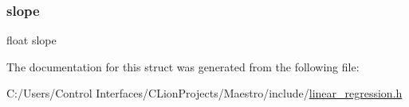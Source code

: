 \mbox{\label{struct_interpolation_model_a837fbee09614bc161b1e2108f2ce43d3}} 
\subsubsection{\texorpdfstring{slope}{slope}}
{\footnotesize\ttfamily float slope}



The documentation for this struct was generated from the following file\+:\begin{DoxyCompactItemize}
\item 
C\+:/\+Users/\+Control Interfaces/\+C\+Lion\+Projects/\+Maestro/include/\hyperlink{linear__regression_8h}{linear\+\_\+regression.\+h}\end{DoxyCompactItemize}
